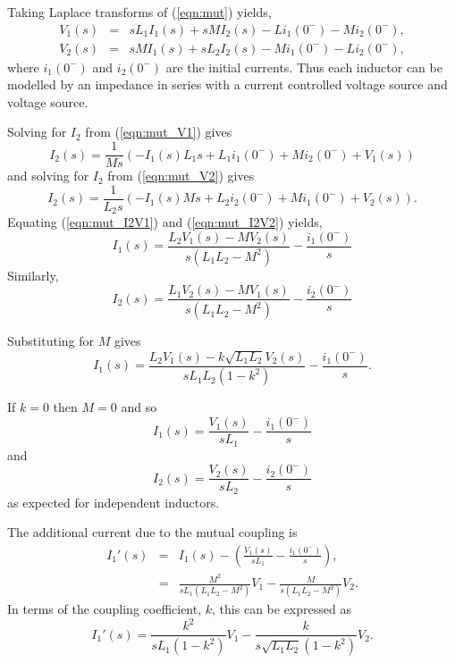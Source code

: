\documentclass[a4paper, 12pt]{article}
\newcommand{\encp}[1]{\left(#1\right)}
\newcommand{\refeqn}[1]{\mbox{(\ref{eqn:#1})}}
\begin{document}
Taking Laplace transforms of \refeqn{mut} yields,
%
\begin{eqnarray}
\label{eqn:mut_V1}
 V_1(s) & = & s L_1 I_1(s) + s M I_2(s) - L i_1(0^{-}) - M i_2(0^{-}), \\
 V_2(s) & = & s M I_1(s) + s L_2 I_2(s) - M i_1(0^{-}) - L i_2(0^{-}),
\label{eqn:mut_V2}
\end{eqnarray}
%
where $i_1(0^{-})$ and $i_2(0^{-})$ are the initial currents.
Thus each inductor can be modelled by an impedance in series with a
current controlled voltage source and voltage source.

Solving for $I_2$ from \refeqn{mut_V1} gives
%
\begin{equation}
  I_2(s) = \frac{1}{M s} \left(- I_1(s) L_1 s + L_1 i_1(0^{-}) + M i_2(0^{-}) + V_1(s)\right)
\label{eqn:mut_I2V1}
\end{equation}
%
and solving for $I_2$ from \refeqn{mut_V2} gives
%
\begin{equation}
I_2(s) = \frac{1}{L_2 s} \left(- I_1(s) M s + L_2 i_2(0^{-}) + M i_1(0^{-}) + V_2(s)\right).
\label{eqn:mut_I2V2}
\end{equation}
%
Equating \refeqn{mut_I2V1} and \refeqn{mut_I2V2} yields,
%
\begin{equation}
I_1(s) =\frac{L_2 V_1(s) - M V_2(s)}{s \left(L_1 L_2 - M^{2}\right)}
- \frac{i_1(0^{-})}{s}
 \end{equation}
%
Similarly,
%
\begin{equation}
I_2(s) =\frac{L_1 V_2(s) - M V_1(s)}{s \left(L_1 L_2 - M^{2}\right)}
- \frac{i_2(0^{-})}{s}
 \end{equation}


Substituting for $M$ gives
%
\begin{equation}
I_1(s) =\frac{L_2 V_1(s) - k\sqrt{L_1 L_2} V_2(s)}{s L_1 L_2 \left(1 - k^2\right)}
- \frac{i_1(0^{-})}{s}.
 \end{equation}



If $k=0$ then $M=0$ and so
%
\begin{equation}
I_1(s) = \frac{V_1(s)}{s L_1} - \frac{i_1(0^{-})}{s}
 \end{equation}
%
and
%
\begin{equation}
I_2(s) = \frac{V_2(s)}{s L_2} - \frac{i_2(0^{-})}{s}
\end{equation}
%
as expected for independent inductors.


The additional current due to the mutual coupling is
%
\begin{eqnarray}
  I_1'(s) & = & I_1(s) - \encp{\frac{V_1(s)}{s L_1} - \frac{i_1(0^{-})}{s}}, \\
          & = & \frac{M^2}{s L_1 \encp{L_1 L_2 - M^2}} V_1 - \frac{M}{s \encp{L_1 L_2 - M^2}} V_2.
\end{eqnarray}
%
In terms of the coupling coefficient, $k$, this can be expressed as
%
\begin{equation}
  I_1'(s) = \frac{k^2}{s L_1 \encp{1-k^2}} V_1 - \frac{k}{s\sqrt{L_1 L_2}\encp{1-k^2}}V_2.
\end{equation}
\end{document}
